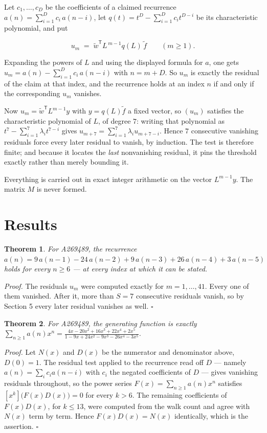 \documentclass[11pt]{article}
\newtheorem{theorem}{Theorem}
\theoremstyle{definition}
\begin{document}
Let $c_1,\dots,c_D$ be the coefficients of a claimed recurrence $a(n) = \sum_{i=1}^{D} c_i\,a(n-i)$, let $q(t) = t^{D} - \sum_{i=1}^{D} c_i t^{D-i}$ be its characteristic polynomial, and put

\[u_m \;=\; \tilde w^{\mathsf T} L^{\,m-1} q(L)\,\tilde f \qquad (m \ge 1).\]

Expanding the powers of $L$ and using the displayed formula for $a$, one gets $u_m = a(n) - \sum_{i=1}^{D} c_i\,a(n-i)$ with $n = m + D$. So $u_m$ is exactly the residual of the claim at that index, and the recurrence holds at an index $n$ if and only if the corresponding $u_m$ vanishes.

Now $u_m = \tilde w^{\mathsf T} L^{m-1} y$ with $y = q(L)\tilde f$ a fixed vector, so $(u_m)$ satisfies the characteristic polynomial of $L$, of degree $7$: writing that polynomial as $t^{7} - \sum_{i=1}^{7} \lambda_i t^{7-i}$ gives $u_{m+7} = \sum_{i=1}^{7} \lambda_i u_{m+7-i}$. Hence $7$ consecutive vanishing residuals force every later residual to vanish, by induction. The test is therefore finite; and because it locates the {\itshape last} nonvanishing residual, it pins the threshold exactly rather than merely bounding it.

Everything is carried out in exact integer arithmetic on the vector $L^{m-1}y$. The matrix $M$ is never formed.

\section{Results}

\begin{theorem} For A269489, the recurrence $a(n) = 9\,a(n-1) - 24\,a(n-2) + 9\,a(n-3) + 26\,a(n-4) + 3\,a(n-5)$ holds for every $n \ge 6$ --- at every index at which it can be stated.\end{theorem}

{\itshape Proof.} The residuals $u_m$ were computed exactly for $m = 1,\dots,41$. Every one of them vanished. After it, more than $S = 7$ consecutive residuals vanish, so by Section 5 every later residual vanishes as well. $\square$

\begin{theorem} For A269489, the generating function is exactly $\sum_{n\ge 1} a(n)x^n = \frac{4x - 20x^{2} + 16x^{3} + 22x^{4} + 2x^{5}}{1 - 9x + 24x^{2} - 9x^{3} - 26x^{4} - 3x^{5}}$.\end{theorem}

{\itshape Proof.} Let $N(x)$ and $D(x)$ be the numerator and denominator above, $D(0)=1$. The residual test applied to the recurrence read off $D$ --- namely $a(n) = \sum_i c_i a(n-i)$ with $c_i$ the negated coefficients of $D$ --- gives vanishing residuals throughout, so the power series $F(x)=\sum_{n\ge 1}a(n)x^n$ satisfies $[x^k]\bigl(F(x)D(x)\bigr) = 0$ for every $k > 6$. The remaining coefficients of $F(x)D(x)$, for $k \le 13$, were computed from the walk count and agree with $N(x)$ term by term. Hence $F(x)D(x) = N(x)$ identically, which is the assertion. $\square$
\end{document}
